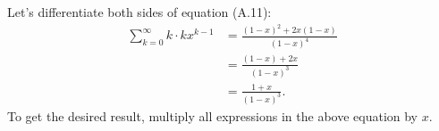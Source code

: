\exercise
Let's differentiate both sides of equation (A.11):
\begin{align*}
    \sum_{k=0}^\infty k\cdot kx^{k-1} &= \frac{(1-x)^2+2x(1-x)}{(1-x)^4} \\
    &= \frac{(1-x)+2x}{(1-x)^3} \\
    &= \frac{1+x}{(1-x)^3}.
\end{align*}
To get the desired result, multiply all expressions in the above equation by $x$.
